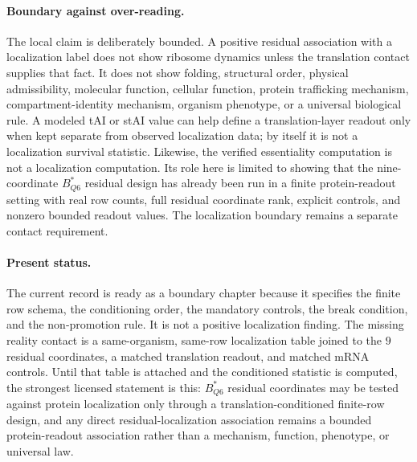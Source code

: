 \paragraph{Boundary against over-reading.}
The local claim is deliberately bounded.  A positive residual association with a localization label does not show ribosome dynamics unless the translation contact supplies that fact.  It does not show folding, structural order, physical admissibility, molecular function, cellular function, protein trafficking mechanism, compartment-identity mechanism, organism phenotype, or a universal biological rule.  A modeled tAI or stAI value can help define a translation-layer readout only when kept separate from observed localization data; by itself it is not a localization survival statistic.  Likewise, the verified essentiality computation is not a localization computation.  Its role here is limited to showing that the nine-coordinate $B^{*}_{Q6}$ residual design has already been run in a finite protein-readout setting with real row counts, full residual coordinate rank, explicit controls, and nonzero bounded readout values.  The localization boundary remains a separate contact requirement.

\paragraph{Present status.}
The current record is ready as a boundary chapter because it specifies the finite row schema, the conditioning order, the mandatory controls, the break condition, and the non-promotion rule.  It is not a positive localization finding.  The missing reality contact is a same-organism, same-row localization table joined to the $9$ residual coordinates, a matched translation readout, and matched mRNA controls.  Until that table is attached and the conditioned statistic is computed, the strongest licensed statement is this: $B^{*}_{Q6}$ residual coordinates may be tested against protein localization only through a translation-conditioned finite-row design, and any direct residual-localization association remains a bounded protein-readout association rather than a mechanism, function, phenotype, or universal law.
